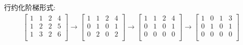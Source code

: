 \begin{example}\label{reduction}
    行约化阶梯形式:
    \begin{equation}
      \begin{gathered}
        \begin{bmatrix}
         1 & 1 & 2 & 4\\
         1 & 2 & 2 & 5\\
         1 & 3 & 2 & 6\\
        \end{bmatrix}
        \longrightarrow
        \begin{bmatrix}
         1 & 1 & 2 & 4\\
         0 & 1 & 0 & 1\\
         0 & 2 & 0 & 2\\
        \end{bmatrix}
        \longrightarrow
        \begin{bmatrix}
         1 & 1 & 2 & 4\\
         0 & 1 & 0 & 1\\
         0 & 0 & 0 & 0\\
        \end{bmatrix}
        \longrightarrow
        \begin{bmatrix}
         1 & 0 & 1 & 3\\
         0 & 1 & 0 & 1\\
         0 & 0 & 0 & 0\\
        \end{bmatrix}
      \end{gathered}
    \end{equation}
\end{example}

